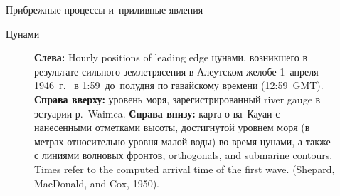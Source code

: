 \begin{chapter}{Прибрежные процессы и~приливные явления}
\begin{section}{Цунами}
\begin{figure}[t!]
\caption{\textbf{Слева:} Hourly positions of leading
edge цунами, возникшего в результате
сильного землетрясения в Алеутском желобе 1~апреля 1946~г.\ %
в 1:59~до~полудня по гавайскому времени (12:59~GMT).  
\textbf{Справа вверху:} уровень моря, зарегистрированный 
river gauge в эстуарии р.~Waimea.  
\textbf{Справа внизу:} карта о-ва~Кауаи с нанесенными отметками высоты,
достигнутой уровнем моря (в метрах относительно уровня малой воды)
во время цунами, а также с линиями волновых фронтов, 
orthogonals, and submarine contours. 
Times refer to the computed arrival time of the first wave. 
(Shepard, MacDonald, and Cox, 1950).}
\label{fig:tsunami}
\end{figure}
%


\end{section}
\end{chapter}

